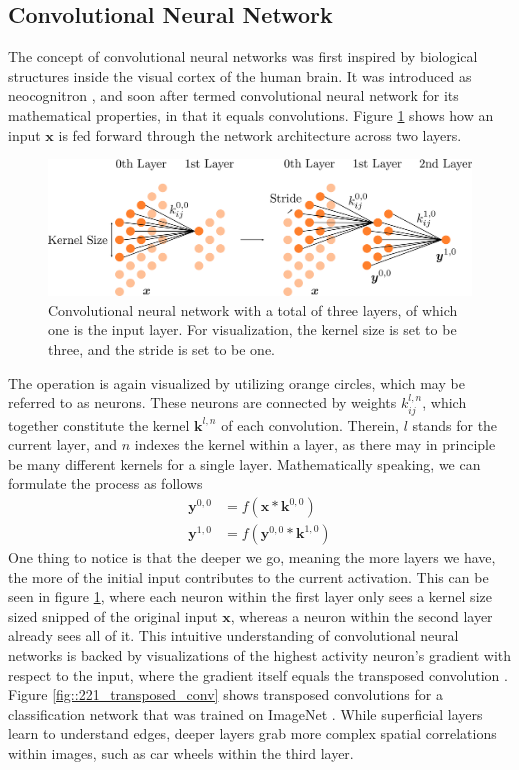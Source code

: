 \subsection{Convolutional Neural Network}
The concept of convolutional neural networks was first inspired by biological structures inside the visual cortex of the human brain. It was introduced as neocognitron \cite{fukushima1980neocognitron}, and soon after termed convolutional neural network for its mathematical properties, in that it equals convolutions. Figure \ref{fig::221_convolutional} shows how an input $\bm{x}$ is fed forward through the network architecture across two layers.   
\begin{figure}[h!]
	\centering
	\includegraphics[scale=.28]{chapters/03_principles_of_machine_learning/img/convolutional.png}
	\caption{Convolutional neural network with a total of three layers, of which one is the input layer. For visualization, the kernel size is set to be three, and the stride is set to be one.}
	\label{fig::221_convolutional}
\end{figure}
The operation is again visualized by utilizing orange circles, which may be referred to as neurons. These neurons are connected by weights $k^{l,n}_{ij}$, which together constitute the kernel $\bm{k}^{l,n}$ of each convolution. Therein, $l$ stands for the current layer, and $n$ indexes the kernel within a layer, as there may in principle be many different kernels for a single layer. Mathematically speaking, we can formulate the process as follows
\begin{align}
	\bm{y}^{0,0} &= f(\bm{x}*\bm{k}^{0,0}) \\
	\bm{y}^{1,0} &= f(\bm{y}^{0,0}*\bm{k}^{1,0})	
\end{align}
One thing to notice is that the deeper we go, meaning the more layers we have, the more of the initial input contributes to the current activation. This can be seen in figure \ref{fig::221_convolutional}, where each neuron within the first layer only sees a kernel size sized snipped of the original input $\bm{x}$, whereas a neuron within the second layer already sees all of it. This intuitive understanding of convolutional neural networks is backed by visualizations of the highest activity neuron's gradient with respect to the input, where the gradient itself equals the transposed convolution \cite{simonyan2013deep}.  Figure \ref{fig::221_transposed_conv} shows transposed convolutions for a classification network that was trained on ImageNet \cite{deng2009imagenet}. While superficial layers learn to understand edges, deeper layers grab more complex spatial correlations within images, such as car wheels within the third layer.
